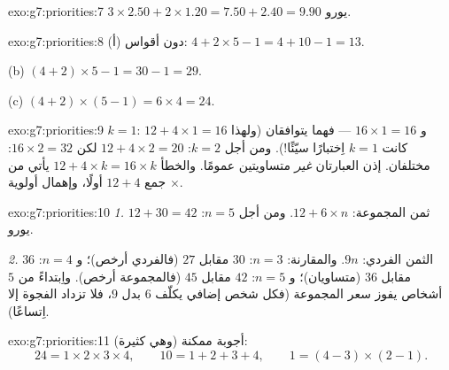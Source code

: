 \begin{solution}{exo:g7:priorities:7}
$3 \times 2.50 + 2 \times 1.20 = 7.50 + 2.40 = 9.90$ يورو.
\end{solution}

\begin{solution}{exo:g7:priorities:8}
(أ) دون أقواس: $4 + 2 \times 5 - 1 = 4 + 10 - 1 = 13$.

(b) $(4 + 2) \times 5 - 1 = 30 - 1 = 29$.

(c) $(4 + 2) \times (5 - 1) = 6 \times 4 = 24$.
\end{solution}

\begin{solution}{exo:g7:priorities:9}
$k = 1$: $12 + 4 \times 1 = 16$ و $16 \times 1 = 16$ --- فهما يتوافقان
(ولهذا كانت $k = 1$ اِختبارًا سيّئًا!). ومن أجل $k = 2$:
$12 + 4 \times 2 = 20$ لكن $16 \times 2 = 32$: مختلفان. إذن العبارتان
\emph{غير} متساويتين عمومًا. والخطأ
$12 + 4 \times k = 16 \times k$ يأتي من جمع $12 + 4$ أولًا،
وإهمال أولوية $\times$.
\end{solution}

\begin{solution}{exo:g7:priorities:10}
\emph{1.} ثمن المجموعة: $12 + 6 \times n$. ومن أجل $n = 5$:
$12 + 30 = 42$ يورو.

\emph{2.} الثمن الفردي: $9n$. والمقارنة: $n = 3$: $30$ مقابل $27$
(فالفردي أرخص)؛ و $n = 4$: $36$ مقابل $36$ (متساويان)؛ و $n = 5$: $42$ مقابل
$45$ (فالمجموعة أرخص). واِبتداءً من $5$ أشخاص يفوز سعر المجموعة
(فكل شخص إضافي يكلّف $6$ بدل $9$، فلا تزداد الفجوة إلا اِتساعًا).
\end{solution}

\begin{solution}{exo:g7:priorities:11}
أجوبة ممكنة (وهي كثيرة):
\[
24 = 1 \times 2 \times 3 \times 4, \qquad
10 = 1 + 2 + 3 + 4, \qquad
1 = (4 - 3) \times (2 - 1).
\]
\end{solution}

